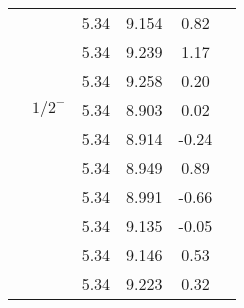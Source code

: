 \documentclass[prd,twocolumn,floatfix,nofootinbib]{revtex4}
\begin{document}
\begin{table*}[!htbp]
\begin{tabular}{cccccc}
                         &$ $     &5.34   &9.154 &0.82  \\
                         &$ $     &5.34   &9.239 &1.17 \\
                         &$ $     &5.34   &9.258 &0.20  \\
            &${1/2}^{-}$     &5.34   &8.903 &0.02 \\
                         &$ $     &5.34   &8.914 &-0.24  \\
                         &$ $     &5.34   &8.949 &0.89  \\
                         &$ $     &5.34   &8.991 &-0.66 \\
                         &$ $     &5.34   &9.135 &-0.05  \\
                         &$ $     &5.34   &9.146 &0.53  \\
                         &$ $     &5.34   &9.223 &0.32 \\                        
       \hline\hline
    \end{tabular}
\end{table*}
\end{document}
